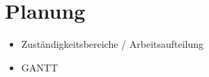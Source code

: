 \newpage
\section{Planung}
\begin{itemize}
    \item Zuständigkeitsbereiche / Arbeitsaufteilung
    \item GANTT
\end{itemize}